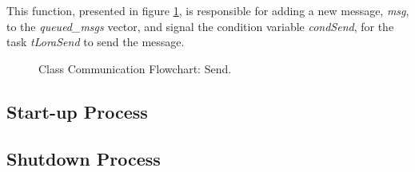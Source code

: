
This function, presented in figure \ref{fig:flow_send}, is responsible for adding a new message, \textit{msg}, to the \textit{queued\_msgs} vector, and signal the condition variable \textit{condSend}, for the task \textit{tLoraSend} to send the message.

\begin{figure}[H]
	\centering	
	\caption{Class Communication Flowchart: Send.}
	\label{fig:flow_send}
\end{figure}


\subsection{Start-up Process}

\subsection{Shutdown Process}

%
%
